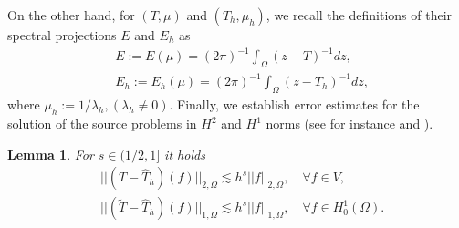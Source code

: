 \documentclass[final,reqno]{elsarticle}
\newtheorem{lemma}{Lemma}[section]
\begin{document}
On the other hand, for $(T,\mu)$ and $(T_h,\mu_h)$, we recall the  definitions of their spectral projections $E$ and $E_h$ as
\begin{align}
    &E:=E(\mu)=(2\pi)^{-1}\int_\Omega (z-T)^{-1}dz,\label{defOpE}\\
    &E_h:=E_h(\mu)=(2\pi)^{-1}\int_\Omega (z-T_h)^{-1}dz\nonumber,%
\end{align}
where $\mu_h:=1/\lambda_h, (\lambda_h\neq 0)$. Finally, we establish error estimates for the solution of the source problems in $H^2$ and $H^1$ norms (see for instance \cite{dassi2025posteriorierrorestimatesc1} and \cite{MV2}).
\begin{lemma}\label{Lema8ApVEP}
    For $s\in (1/2,1]$ it holds
    \begin{align}
        &||(T-\widehat{T}_h)(f)||_{2,\Omega}\lesssim h^s||f||_{2,\Omega},\quad \forall f\in V,\nonumber\\
        &||(\widetilde{T}-\widehat{T}_h)(f)||_{1,\Omega}\lesssim h^s||f||_{1,\Omega},\quad \forall f\in H_0^1(\Omega).\nonumber
    \end{align}
\end{lemma}
\end{document}
